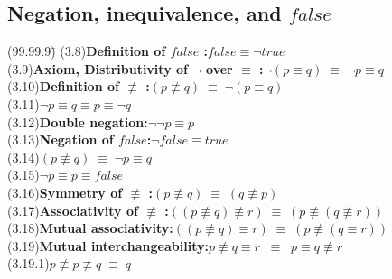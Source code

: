 \documentclass[12pt, fleqn, leqno]{article}
\newcommand{\lgap}{2pt}                             %
\newcommand{\equivs}{\ensuremath{\;\equiv\;}}       %
\newcommand{\equivss}{\ensuremath{\;\;\equiv\;\;}}  %
\newcommand{\nequiv}{\ensuremath{\not\equiv}}       %
\begin{document}
\subsection*{Negation, inequivalence, and $false$}
\begin{tabbing}
(99.99.9)\;\=\kill
(3.8)\>\textbf{Definition of $false$ :}\quad $false\equiv \neg true$\\[\lgap]
(3.9)\>\textbf{Axiom, Distributivity of $\neg$ over $\equiv$ :}\quad $\neg (p\equiv q) \equivs \neg p \equiv q$\\[\lgap]
(3.10)\>\textbf{Definition of $\nequiv$ :}\quad $(p\nequiv q)\equivs\neg(p\equiv q)$\\[\lgap]
(3.11)\>$\neg p \equiv q \equiv p \equiv \neg q$\\[\lgap]
(3.12)\>\textbf{Double negation:}\quad $\neg\neg p\equiv p$\\[\lgap]
(3.13)\>\textbf{Negation of $false$:}\quad $\neg false\equiv true$\\[\lgap]
(3.14)\>$(p\nequiv q)\equivs\neg p\equiv q$\\[\lgap]
(3.15)\>$\neg p\equiv p\equiv false$\\[\lgap]
(3.16)\>\textbf{Symmetry of $\nequiv$ :}\quad $(p\nequiv q) \equivs (q\nequiv p)$\\[\lgap]
(3.17)\>\textbf{Associativity of $\nequiv$ :}\quad $((p\nequiv q) \nequiv r)\equivs (p\nequiv (q\nequiv r))$\\[\lgap]
(3.18)\>\textbf{Mutual associativity:}\quad $((p\nequiv q) \equiv r)\equivs (p\nequiv (q\equiv r))$\\[\lgap]
(3.19)\>\textbf{Mutual interchangeability:}\quad $p\nequiv q \equiv r\equivss p\equiv q\nequiv r$\\
(3.19.1)\>$p\nequiv p \nequiv q\equivs q$\\
\end{tabbing}
\end{document}
